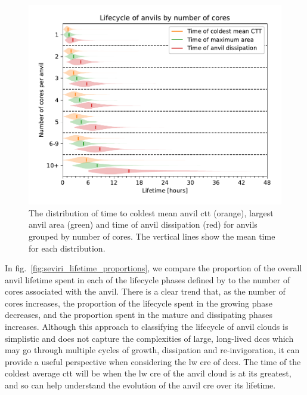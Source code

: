 \documentclass[acp, manuscript]{copernicus}
\begin{document}
\begin{figure}[tp]
    \includegraphics[width=12cm]{figures/fig08.pdf}
    \caption[
    The distribution of time to coldest mean anvil \acrshort{ctt}, largest anvil area and time of anvil dissipation
    ]{
    The distribution of time to coldest mean anvil \acrshort{ctt} (orange), largest anvil area (green) and time of anvil dissipation (red) for anvils grouped by number of cores. The vertical lines show the mean time for each distribution.
    }
    \label{fig:seviri_lifetime_dists}
\end{figure}


In fig.~\ref{fig:seviri_lifetime_proportions}, we compare the proportion of the overall anvil lifetime spent in each of the lifecycle phases defined by \citet{futyan_deep_2007} to the number of cores associated with the anvil. 
There is a clear trend that, as the number of cores increases, the proportion of the lifecycle spent in the growing phase decreases, and the proportion spent in the mature and dissipating phases increases.
 Although this approach to classifying the lifecycle of anvil clouds is simplistic and does not capture the complexities of large, long-lived \acrshort{dcc}s which may go through multiple cycles of growth, dissipation and re-invigoration, it can provide a useful perspective when considering the \acrshort{lw} \acrshort{cre} of \acrshort{dcc}s. 
 The time of the coldest average \acrshort{ctt} will be when the \acrshort{lw} \acrshort{cre} of the anvil cloud is at its greatest, and so can help understand the evolution of the anvil \acrshort{cre} over its lifetime.
\end{document}
